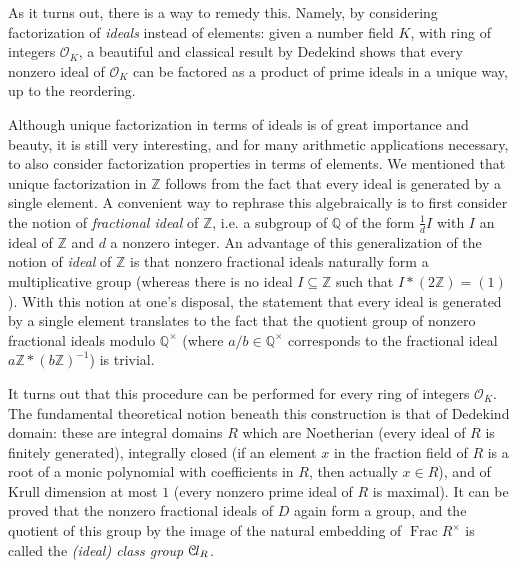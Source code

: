 \documentclass[a4paper,USenglish,cleveref, autoref, thm-restate]{lipics-v2021}
\newcommand*{\OK}[1][K]{\mathcal{O}_{#1}}
\newcommand*{\Cl}{\mathcal{C}\kern-.075em l}
\newcommand{\Q}{\mathbb{Q}}
\newcommand{\Z}{\mathbb{Z}}
\DeclareMathOperator{\Frac}{Frac}
\begin{document}
As it turns out, there is a way to remedy this. Namely, by considering factorization of \emph{ideals} instead of elements: given a number field $K$, with ring of integers $\OK$, a beautiful and classical result by Dedekind shows that every nonzero ideal of $\OK$ can be factored as a product of prime ideals in a unique way, up to the reordering.

Although unique factorization in terms of ideals is of great importance and beauty, it is still very interesting, and for many arithmetic applications necessary, to also consider factorization properties in terms of elements. We mentioned that unique factorization in $\Z$ follows from the fact that every ideal is generated by a single element. A convenient way to rephrase this algebraically is to first consider the notion of \emph{fractional ideal} of $\Z$, i.e. a subgroup of $\Q$ of the form $\frac{1}{d} I$ with $I$ an ideal of $\Z$ and $d$ a nonzero integer.
An advantage of this generalization of the notion of \emph{ideal} of $\Z$ is that nonzero fractional ideals naturally form a multiplicative group (whereas there is no ideal $I\subseteq \Z$ such that $I*(2\Z)=(1)$). With this notion at one's disposal, the statement that every ideal is generated by a single element translates to the fact that the quotient group of nonzero fractional ideals modulo $\Q^\times$ (where $a/b\in\Q^\times$ corresponds to the fractional ideal $a\Z\ast (b\Z)^{-1}$) is trivial.

It turns out that this procedure can be %
performed for every ring of integers $\OK$. The fundamental theoretical notion beneath this construction is that of Dedekind domain: these are integral domains $R$ which are Noetherian (every ideal of $R$ is finitely generated), integrally closed (if an element $x$ in the fraction field of $R$ is a root of a monic polynomial with coefficients in $R$, then actually $x \in R$), and of Krull dimension at most $1$ (every nonzero prime ideal of $R$ is maximal).
It can be proved that the nonzero fractional ideals of $D$ %
again form a group, and the quotient of this group by the image of the natural embedding of $\Frac R^\times$ is called the \emph{(ideal) class group} $\Cl_{R}$.
\end{document}
